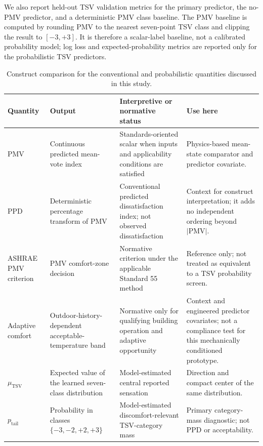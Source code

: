 We also report held-out TSV validation metrics for the primary predictor, the no-PMV predictor, and a deterministic PMV class baseline. The PMV baseline is computed by rounding PMV to the nearest seven-point TSV class and clipping the result to $[-3,+3]$. It is therefore a scalar-label baseline, not a calibrated probability model; log loss and expected-probability metrics are reported only for the probabilistic TSV predictors.

\begin{table}[htbp]
\centering
\caption{Construct comparison for the conventional and probabilistic quantities discussed in this study.}
\label{tab:construct_comparison}
\footnotesize
\begin{tabularx}{\textwidth}{@{}p{}p{}p{}X@{}}
\toprule
\textbf{Quantity} & \textbf{Output} & \textbf{Interpretive or normative status} & \textbf{Use here} \\
\midrule
PMV & Continuous predicted mean-vote index & Standards-oriented scalar when inputs and applicability conditions are satisfied & Physics-based mean-state comparator and predictor covariate. \\
PPD & Deterministic percentage transform of PMV & Conventional predicted dissatisfaction index; not observed dissatisfaction & Context for construct interpretation; it adds no independent ordering beyond $|\mathrm{PMV}|$. \\
ASHRAE PMV criterion & PMV comfort-zone decision & Normative criterion under the applicable Standard 55 method & Reference only; not treated as equivalent to a TSV probability screen. \\
Adaptive comfort & Outdoor-history-dependent acceptable-temperature band & Normative only for qualifying building operation and adaptive opportunity & Context and engineered predictor covariates; not a compliance test for this mechanically conditioned prototype. \\
$\mu_{\mathrm{TSV}}$ & Expected value of the learned seven-class distribution & Model-estimated central reported sensation & Direction and compact center of the same distribution. \\
$p_{\mathrm{tail}}$ & Probability in classes $\{-3,-2,+2,+3\}$ & Model-estimated discomfort-relevant TSV-category mass & Primary category-mass diagnostic; not PPD or acceptability. \\
\bottomrule
\end{tabularx}
\end{table}

